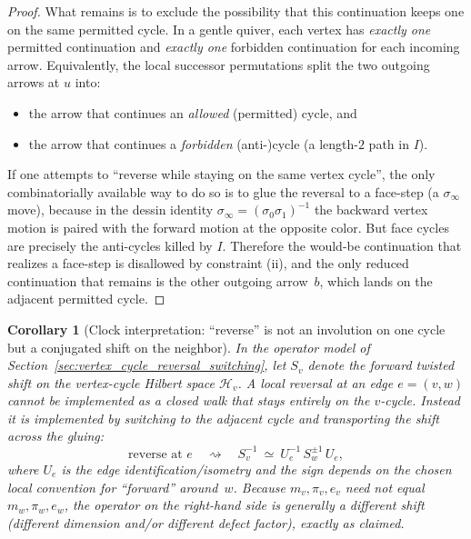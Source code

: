 \documentclass[11pt,oneside]{amsbook}
\numberwithin{equation}{section}
\theoremstyle{plain}
\newtheorem{corollary}[theorem]{Corollary}
\theoremstyle{definition}
\theoremstyle{remark}
\newcommand{\cH}{\mathcal{H}}
\begin{document}
\begin{enumerate}
\begin{proof}
What remains is to exclude the possibility that this continuation keeps one on the same permitted cycle.
In a gentle quiver, each vertex has \emph{exactly one} permitted continuation and \emph{exactly one} forbidden continuation for each incoming arrow.
Equivalently, the local successor permutations split the two outgoing arrows at $u$ into:
\begin{itemize}
\item the arrow that continues an \emph{allowed} (permitted) cycle, and
\item the arrow that continues a \emph{forbidden} (anti-)cycle (a length-$2$ path in $I$).
\end{itemize}
If one attempts to ``reverse while staying on the same vertex cycle'', the only combinatorially available way to do so is to glue the reversal to a face-step (a $\sigma_\infty$ move), because in the dessin identity
$\sigma_\infty=(\sigma_0\sigma_1)^{-1}$ the backward vertex motion is paired with the forward motion at the opposite color.
But face cycles are precisely the anti-cycles killed by $I$.
Therefore the would-be continuation that realizes a face-step is disallowed by constraint (ii), and the only reduced continuation that remains is the other outgoing arrow~$b$, which lands on the adjacent permitted cycle.
\end{proof}

\begin{corollary}[Clock interpretation: ``reverse'' is not an involution on one cycle but a conjugated shift on the neighbor]
\label{cor:reverse_is_conjugated_shift}
In the operator model of Section~\ref{sec:vertex_cycle_reversal_switching}, let $S_v$ denote the forward twisted shift on the vertex-cycle Hilbert space $\cH_v$.
A local reversal at an edge $e=(v,w)$ cannot be implemented as a closed walk that stays entirely on the $v$-cycle.
Instead it is implemented by switching to the adjacent cycle and transporting the shift across the gluing:
\[
\text{reverse at }e\quad\rightsquigarrow\quad
S_v^{-1}\ \simeq\ U_e^{-1}\,S_w^{\pm 1}\,U_e,
\]
where $U_e$ is the edge identification/isometry and the sign depends on the chosen local convention for ``forward'' around~$w$.
Because $m_v,\pi_v,e_v$ need not equal $m_w,\pi_w,e_w$, the operator on the right-hand side is generally a \emph{different} shift (different dimension and/or different defect factor), exactly as claimed.
\end{corollary}


\end{enumerate}
\end{document}
